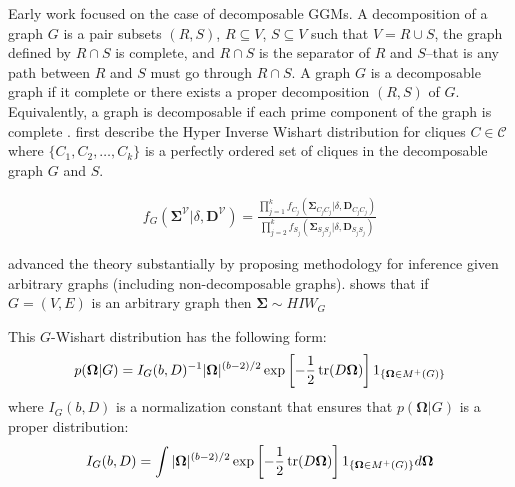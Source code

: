 \begin{DoubleSpace*}
Early work \cite{dawid1993} focused on the case of decomposable GGMs. A decomposition of a graph $G$ is a pair subsets $(R,S)$, $R\subseteq V$, $S\subseteq V$ such that $V=R \cup S$, the graph defined by $R \cap S$ is complete, and $R \cap S$ is the separator of $R$ and $S$--that is any path between $R$ and $S$ must go through $R \cap S$. A graph $G$ is a decomposable graph if it complete or there exists a proper decomposition $(R,S)$ of $G$. Equivalently, a graph is decomposable if each prime component of the graph is complete \cite{roverato2002}. \cite{dawid1993} first describe the Hyper Inverse Wishart distribution for cliques $C\in \mathcal{C}$ where $\{C_1,C_2, \hdots,C_k \}$ is a perfectly ordered set of cliques in the decomposable graph $G$ and $S$.

\begin{align}
f_G(\boldsymbol{\Sigma}^{\mathcal{V}}|\delta,\textbf{D}^{\mathcal{V}})= \frac{\prod_{j=1}^k f_{C_j}(\boldsymbol{\Sigma}_{C_j C_j}|\delta,\textbf{D}_{C_j C_j})}{\prod_{j=2}^k f_{S_j}(\boldsymbol{\Sigma}_{S_j S_j}|\delta,\textbf{D}_{S_j S_j})}
\end{align}

\cite{roverato2002} advanced the theory substantially by proposing methodology for inference given arbitrary graphs (including non-decomposable graphs). \cite{roverato2002} shows that if $G=(V,E)$ is an arbitrary graph then $\boldsymbol{\Sigma} \sim HIW_G$

This $G$-Wishart distribution has the following form: 
\begin{align}
p(\boldsymbol{\Omega}|G)=I_G(b,D)^{-1}|\boldsymbol{\Omega}|^{(b-2)/2} \exp \left[-\frac{1}{2} \operatorname{tr}(D \boldsymbol{\Omega}) \right] 1_{ \{\boldsymbol{\Omega} \in M^+(G)\} }
\end{align}
where $I_G(b,D)$ is a normalization constant that ensures that $p(\boldsymbol{\Omega}|G)$ is a proper distribution:
\begin{align}
I_G(b,D)=\int |\boldsymbol{\Omega}|^{(b-2)/2} \exp \left[-\frac{1}{2} \operatorname{tr}(D \boldsymbol{\Omega}) \right] 1_{ \{\boldsymbol{\Omega} \in M^+(G)\} } d\boldsymbol{\Omega}
\end{align}

\end{DoubleSpace*}